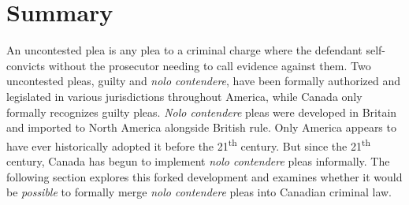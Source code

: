 \section{Summary}

An uncontested plea is any plea to a criminal charge where the defendant self-convicts without the prosecutor needing to call evidence against them. Two uncontested pleas, guilty and \textit{nolo contendere}, have been formally authorized and legislated in various jurisdictions throughout America, while Canada only formally recognizes guilty pleas. \textit{Nolo contendere} pleas were developed in Britain and imported to North America alongside British rule. Only America appears to have ever historically adopted it before the 21\textsuperscript{th} century. But since the 21\textsuperscript{th} century, Canada has begun to implement \textit{nolo contendere} pleas informally. The following section explores this forked development and examines whether it would be \textit{possible} to formally merge \textit{nolo contendere} pleas into Canadian criminal law. 